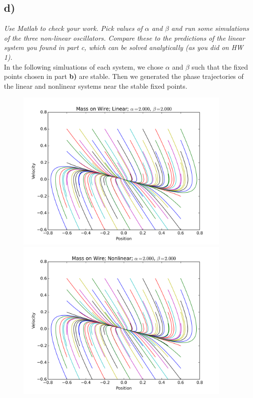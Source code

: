 \documentclass[12pt]{article}
\begin{document}
\subsection*{ d)}
\emph{Use Matlab to check your work.  Pick values of $\alpha$ and $\beta$ and run some simulations of the three non-linear oscillators.  Compare these to the predictions of the linear system you found in part c, which can be solved analytically (as you did on HW 1).} \\

In the following simluations of each system, we chose $\alpha$ and $\beta$ such that the fixed points chosen in part \textbf{b)} are stable.  Then we generated the phase trajectories of the linear and nonlinear systems near the stable fixed points.

\begin{figure}[ht]
    \centering
    \includegraphics[width=400px]{figures/1_d_Mass_on_Wire_linear}
    \includegraphics[width=400px]{figures/1_d_Mass_on_Wire_nonlinear}
\end{figure}
\end{document}

